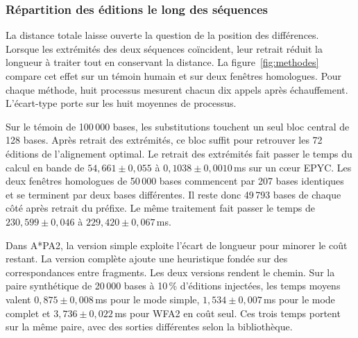 \subsubsection{Répartition des éditions le long des séquences}
La distance totale laisse ouverte la question de la position des différences. Lorsque les extrémités des deux séquences coïncident, leur retrait réduit la longueur à traiter tout en conservant la distance. La figure~\ref{fig:methodes} compare cet effet sur un témoin humain et sur deux fenêtres homologues. Pour chaque méthode, huit processus mesurent chacun dix appels après échauffement. L’écart-type porte sur les huit moyennes de processus.

Sur le témoin de 100\,000 bases, les substitutions touchent un seul bloc central de 128 bases. Après retrait des extrémités, ce bloc suffit pour retrouver les 72 éditions de l’alignement optimal. Le retrait des extrémités fait passer le temps du calcul en bande de \(54{,}661\pm0{,}055\) à \(0{,}1038\pm0{,}0010\)\,ms sur un cœur EPYC. Les deux fenêtres homologues de 50\,000 bases commencent par 207 bases identiques et se terminent par deux bases différentes. Il reste donc 49\,793 bases de chaque côté après retrait du préfixe. Le même traitement fait passer le temps de \(230{,}599\pm0{,}046\) à \(229{,}420\pm0{,}067\)\,ms.

Dans A*PA2, la version simple exploite l’écart de longueur pour minorer le coût restant. La version complète ajoute une heuristique fondée sur des correspondances entre fragments. Les deux versions rendent le chemin. Sur la paire synthétique de 20\,000 bases à 10\,\% d'éditions injectées, les temps moyens valent \(0{,}875\pm0{,}008\)\,ms pour le mode simple, \(1{,}534\pm0{,}007\)\,ms pour le mode complet et \(3{,}736\pm0{,}022\)\,ms pour WFA2 en coût seul. Ces trois temps portent sur la même paire, avec des sorties différentes selon la bibliothèque.


